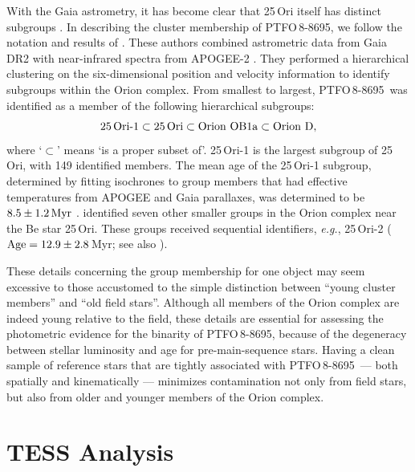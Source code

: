 \documentclass[12pt,twocolumn,tighten]{aastex62}
\newcommand{\ptfo}{PTFO$\,$8-8695}
\begin{document}
With the Gaia astrometry, it has become clear that 25$\,$Ori itself
has distinct subgroups
\citep{kounkel_apogee2_2018,briceno_cidaII_2019}.  In describing the
cluster membership of \ptfo, we follow the notation and results of
\citet{kounkel_apogee2_2018}.  These authors combined astrometric data
from Gaia DR2 with near-infrared spectra from APOGEE-2
\citep{gunn_sdss_2006,majewski_apache_2017,blanton_sloan_2017,zasowski_target_2017,cottle_apogee2_2018}.
They performed a hierarchical clustering on the six-dimensional
position and velocity information to identify subgroups within the
Orion complex.  From smallest to largest, \ptfo\ was identified as a
member of the following hierarchical subgroups:
\begin{equation}
  {\rm 25\,Ori\text{-}1}
  \subset {\rm 25\,Ori}
  \subset {\rm Orion\ OB1a}
  \subset {\rm Orion\ D},
\end{equation}
where `$\subset$' means `is a proper subset of'.  25$\,$Ori-1 is the
largest subgroup of 25$\,$Ori, with 149 identified members.  The mean
age of the 25$\,$Ori-1 subgroup, determined by fitting isochrones to
group members that had effective temperatures from APOGEE and Gaia
parallaxes, was determined to be $8.5\pm1.2\,{\rm Myr}$
\citep[see][Section 2.3]{kounkel_apogee2_2018}.
\citet{kounkel_apogee2_2018} identified seven other smaller groups in
the Orion complex near the Be star 25$\,$Ori. These groups received
sequential identifiers, {\it e.g.}, 25$\,$Ori-2 (${\rm Age}
=12.9\pm2.8\,$Myr; see also \citealt{briceno_cidaII_2019}).

These details concerning the group membership for one object may seem
excessive to those accustomed to the simple distinction between
``young cluster members'' and ``old field stars''.  Although all
members of the Orion complex are indeed young relative to the field,
these details are essential for assessing the photometric evidence for
the binarity of \ptfo, because of the degeneracy between stellar
luminosity and age for pre-main-sequence stars.  Having a clean sample
of reference stars that are tightly associated with \ptfo\ --- both
spatially and kinematically --- minimizes contamination not only from
field stars, but also from older and younger members of the Orion
complex.


\section{TESS Analysis}
\label{sec:tess}
\end{document}
